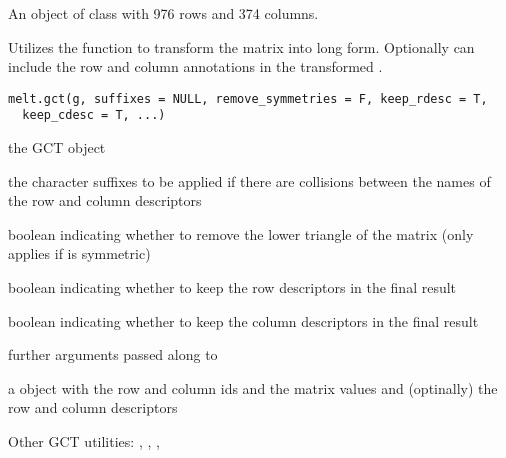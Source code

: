 \documentclass[letterpaper]{book}
\begin{document}
%
\begin{Format}
An object of class  with 976 rows and 374 columns.
\end{Format}
%
\begin{Description}\relax
Utilizes the  function to transform the
matrix into long form. Optionally can include the row and column
annotations in the transformed .
\end{Description}
%
\begin{Usage}
\begin{verbatim}
melt.gct(g, suffixes = NULL, remove_symmetries = F, keep_rdesc = T,
  keep_cdesc = T, ...)
\end{verbatim}
\end{Usage}
%
\begin{Arguments}
\begin{ldescription}
\item[\code{g}] the GCT object

\item[\code{suffixes}] the character suffixes to be applied if there are
collisions between the names of the row and column descriptors

\item[\code{remove\_symmetries}] boolean indicating whether to remove
the lower triangle of the matrix (only applies if  is symmetric)

\item[\code{keep\_rdesc}] boolean indicating whether to keep the row
descriptors in the final result

\item[\code{keep\_cdesc}] boolean indicating whether to keep the column
descriptors in the final result

\item[\code{...}] further arguments passed along to 
\end{ldescription}
\end{Arguments}
%
\begin{Value}
a  object with the row and column ids and the matrix
values and (optinally) the row and column descriptors
\end{Value}
%
\begin{SeeAlso}\relax
Other GCT utilities: ,
, ,
\end{SeeAlso}
\end{document}
